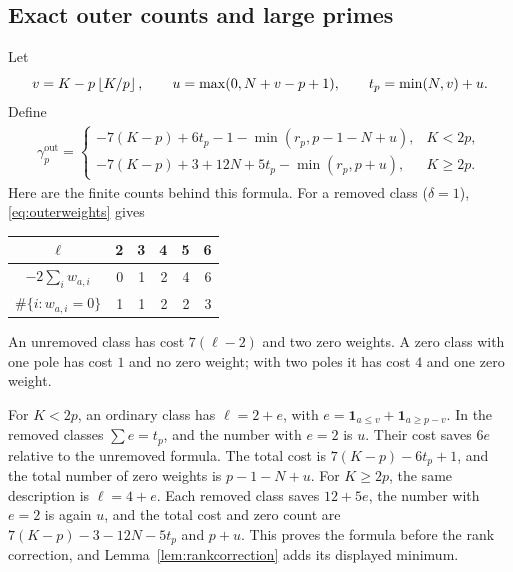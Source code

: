 \subsection{Exact outer counts and large primes}
Let
\[
 v=K-p\left\lfloor K/p\right\rfloor,\qquad u=\max(0,N+v-p+1),\qquad
 t_p=\min(N,v)+u.
\]
Define
\begin{equation}\label{eq:gammaout}
\begin{split}
 \gamma_p^{\mathrm{out}}=
 \begin{cases}
 -7(K-p)+6t_p-1-\min(r_p,p-1-N+u),&K<2p,\\
 -7(K-p)+3+12N+5t_p-\min(r_p,p+u),&K\ge2p.
 \end{cases}
\end{split}
\end{equation}
Here are the finite counts behind this formula. For a removed class
($\delta=1$), \eqref{eq:outerweights} gives
\begin{center}
\begin{tabular}{c|rrrrr}
$\ell$ & 2&3&4&5&6\\\hline
$-2\sum_iw_{a,i}$ &0&1&2&4&6\\
$\#\{i:w_{a,i}=0\}$ &1&1&2&2&3
\end{tabular}
\end{center}
An unremoved class has cost $7(\ell-2)$ and two zero weights. A
zero class with one pole has cost $1$ and no zero weight; with two poles
it has cost $4$ and one zero weight.

For $K<2p$, an ordinary class has $\ell=2+e$, with
$e=\boldsymbol1_{a\le v}+\boldsymbol1_{a\ge p-v}$. In the removed classes
$\sum e=t_p$, and the number with $e=2$ is $u$. Their cost saves $6e$
relative to the unremoved formula. The total cost is
$7(K-p)-6t_p+1$, and the total number of zero weights is $p-1-N+u$.
For $K\ge2p$, the same description is $\ell=4+e$. Each removed class
saves $12+5e$, the number with $e=2$ is again $u$, and the total cost
and zero count are $7(K-p)-3-12N-5t_p$ and $p+u$. This proves the
formula before the rank correction, and
Lemma~\ref{lem:rankcorrection} adds its displayed minimum.

